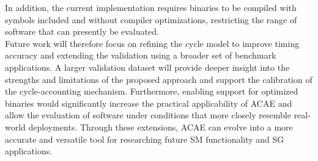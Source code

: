 \documentclass[english]{tudscrartcl}
\begin{document}
		In addition, the current implementation requires binaries to be compiled with symbols included and without compiler optimizations, restricting the range of software that can presently be evaluated.
		\\
		Future work will therefore focus on refining the cycle model to improve timing accuracy and extending the validation using a broader set of benchmark applications.
		A larger validation dataset will provide deeper insight into the strengths and limitations of the proposed approach and support the calibration of the cycle-accounting mechanism.
		Furthermore, enabling support for optimized binaries would significantly increase the practical applicability of ACAE and allow the evaluation of software under conditions that more closely resemble real-world deployments.
		Through these extensions, ACAE can evolve into a more accurate and versatile tool for researching future \ac{SM} functionality and \ac{SG} applications.
	
	\printbibliography
\end{document}
